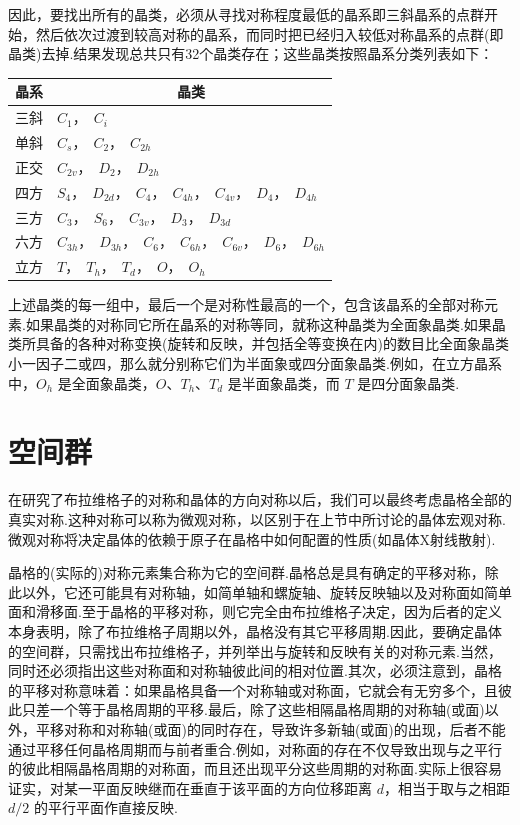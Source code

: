 因此，要找出所有的晶类，必须从寻找对称程度最低的晶系即三斜晶系的点群开始，然后依次过渡到较高对称的晶系，而同时把已经归入较低对称晶系的点群(即晶类)去掉.结果发现总共只有32个晶类存在；这些晶类按照晶系分类列表如下：
\begin{center}
\begin{tabular}{c|l}
\hline
晶系 & \multicolumn{1}{c}{晶类} \\
\hline
三斜 & $C_1$，\ $C_i$ \\
单斜 & $C_s$，\ $C_2$，\ $C_{2h}$ \\
正交 & $C_{2v}$，\ $D_2$，\ $D_{2h}$ \\
四方 & $S_4$，\ $D_{2d}$，\ $C_4$，\ $C_{4h}$，\ $C_{4v}$，\ $D_4$，\ $D_{4h}$ \\
三方 & $C_3$，\ $S_6$，\ $C_{3v}$，\ $D_3$，\ $D_{3d}$ \\
六方 & $C_{3h}$，\ $D_{3h}$，\ $C_6$，\ $C_{6h}$，\ $C_{6v}$，\ $D_6$，\ $D_{6h}$ \\
立方 & $T$，\ $T_h$，\ $T_d$，\ $O$，\ $O_h$ \\
\hline
\end{tabular}
\end{center}

上述晶类的每一组中，最后一个是对称性最高的一个，包含该晶系的全部对称元素.如果晶类的对称同它所在晶系的对称等同，就称这种晶类为全面象晶类.如果晶类所具备的各种对称变换(旋转和反映，并包括全等变换在内)的数目比全面象晶类小一因子二或四，那么就分别称它们为半面象或四分面象晶类.例如，在立方晶系中，$O_h$ 是全面象晶类，$O$、$T_h$、$T_d$ 是半面象晶类，而 $T$ 是四分面象晶类.

\section{空间群}

在研究了布拉维格子的对称和晶体的方向对称以后，我们可以最终考虑晶格全部的真实对称.这种对称可以称为微观对称，以区别于在上节中所讨论的晶体宏观对称.微观对称将决定晶体的依赖于原子在晶格中如何配置的性质(如晶体X射线散射).

晶格的(实际的)对称元素集合称为它的空间群.晶格总是具有确定的平移对称，除此以外，它还可能具有对称轴，如简单轴和螺旋轴、旋转反映轴以及对称面如简单面和滑移面.至于晶格的平移对称，则它完全由布拉维格子决定，因为后者的定义本身表明，除了布拉维格子周期以外，晶格没有其它平移周期.因此，要确定晶体的空间群，只需找出布拉维格子，并列举出与旋转和反映有关的对称元素.当然，同时还必须指出这些对称面和对称轴彼此间的相对位置.其次，必须注意到，晶格的平移对称意味着：如果晶格具备一个对称轴或对称面，它就会有无穷多个，且彼此只差一个等于晶格周期的平移.最后，除了这些相隔晶格周期的对称轴(或面)以外，平移对称和对称轴(或面)的同时存在，导致许多新轴(或面)的出现，后者不能通过平移任何晶格周期而与前者重合.例如，对称面的存在不仅导致出现与之平行的彼此相隔晶格周期的对称面，而且还出现平分这些周期的对称面.实际上很容易证实，对某一平面反映继而在垂直于该平面的方向位移距离 $d$，相当于取与之相距 $d/2$ 的平行平面作直接反映.


